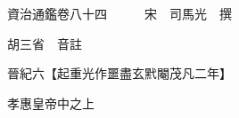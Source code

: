 










 


 
 


 

  
  
  
  
  





  
  
  
  
  
 
  

  

  
  
  



  

 
 

  
   




  

  
  


  　　資治通鑑卷八十四　　　宋　司馬光　撰

　　胡三省　音註

　　晉紀六【起重光作噩盡玄黓閹茂凡二年】

　　孝惠皇帝中之上

